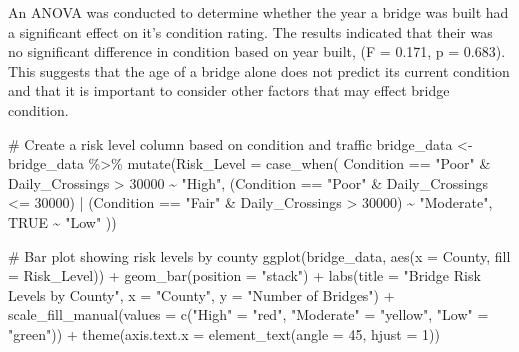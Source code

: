 \documentclass[
  letterpaper,
  DIV=11,
  numbers=noendperiod]{scrreprt}
\newenvironment{Shaded}{\begin{snugshade}}{\end{snugshade}}
\newcommand{\AttributeTok}[1]{\textcolor[rgb]{0.40,0.45,0.13}{#1}}
\newcommand{\CommentTok}[1]{\textcolor[rgb]{0.37,0.37,0.37}{#1}}
\newcommand{\ConstantTok}[1]{\textcolor[rgb]{0.56,0.35,0.01}{#1}}
\newcommand{\DecValTok}[1]{\textcolor[rgb]{0.68,0.00,0.00}{#1}}
\newcommand{\FunctionTok}[1]{\textcolor[rgb]{0.28,0.35,0.67}{#1}}
\newcommand{\NormalTok}[1]{\textcolor[rgb]{0.00,0.23,0.31}{#1}}
\newcommand{\OtherTok}[1]{\textcolor[rgb]{0.00,0.23,0.31}{#1}}
\newcommand{\SpecialCharTok}[1]{\textcolor[rgb]{0.37,0.37,0.37}{#1}}
\newcommand{\StringTok}[1]{\textcolor[rgb]{0.13,0.47,0.30}{#1}}
\begin{document}
An ANOVA was conducted to determine whether the year a bridge was built
had a significant effect on it's condition rating. The results indicated
that their was no significant difference in condition based on year
built, (F = 0.171, p = 0.683). This suggests that the age of a bridge
alone does not predict its current condition and that it is important to
consider other factors that may effect bridge condition.

\begin{Shaded}
\begin{Highlighting}[]
\CommentTok{\# Create a risk level column based on condition and traffic}
\NormalTok{bridge\_data }\OtherTok{\textless{}{-}}\NormalTok{ bridge\_data }\SpecialCharTok{\%\textgreater{}\%}
  \FunctionTok{mutate}\NormalTok{(}\AttributeTok{Risk\_Level =} \FunctionTok{case\_when}\NormalTok{(}
\NormalTok{    Condition }\SpecialCharTok{==} \StringTok{"Poor"} \SpecialCharTok{\&}\NormalTok{ Daily\_Crossings }\SpecialCharTok{\textgreater{}} \DecValTok{30000} \SpecialCharTok{\textasciitilde{}} \StringTok{"High"}\NormalTok{,}
\NormalTok{    (Condition }\SpecialCharTok{==} \StringTok{"Poor"} \SpecialCharTok{\&}\NormalTok{ Daily\_Crossings }\SpecialCharTok{\textless{}=} \DecValTok{30000}\NormalTok{) }\SpecialCharTok{|}
\NormalTok{      (Condition }\SpecialCharTok{==} \StringTok{"Fair"} \SpecialCharTok{\&}\NormalTok{ Daily\_Crossings }\SpecialCharTok{\textgreater{}} \DecValTok{30000}\NormalTok{) }\SpecialCharTok{\textasciitilde{}} \StringTok{"Moderate"}\NormalTok{,}
    \ConstantTok{TRUE} \SpecialCharTok{\textasciitilde{}} \StringTok{"Low"}
\NormalTok{  ))}

\CommentTok{\# Bar plot showing risk levels by county}
\FunctionTok{ggplot}\NormalTok{(bridge\_data, }\FunctionTok{aes}\NormalTok{(}\AttributeTok{x =}\NormalTok{ County, }\AttributeTok{fill =}\NormalTok{ Risk\_Level)) }\SpecialCharTok{+}
  \FunctionTok{geom\_bar}\NormalTok{(}\AttributeTok{position =} \StringTok{"stack"}\NormalTok{) }\SpecialCharTok{+}
  \FunctionTok{labs}\NormalTok{(}\AttributeTok{title =} \StringTok{"Bridge Risk Levels by County"}\NormalTok{,}
       \AttributeTok{x =} \StringTok{"County"}\NormalTok{,}
       \AttributeTok{y =} \StringTok{"Number of Bridges"}\NormalTok{) }\SpecialCharTok{+}
  \FunctionTok{scale\_fill\_manual}\NormalTok{(}\AttributeTok{values =} \FunctionTok{c}\NormalTok{(}\StringTok{"High"} \OtherTok{=} \StringTok{"red"}\NormalTok{, }\StringTok{"Moderate"} \OtherTok{=} \StringTok{"yellow"}\NormalTok{, }\StringTok{"Low"} \OtherTok{=} \StringTok{"green"}\NormalTok{)) }\SpecialCharTok{+}
  \FunctionTok{theme}\NormalTok{(}\AttributeTok{axis.text.x =} \FunctionTok{element\_text}\NormalTok{(}\AttributeTok{angle =} \DecValTok{45}\NormalTok{, }\AttributeTok{hjust =} \DecValTok{1}\NormalTok{))}
\end{Highlighting}
\end{Shaded}
\end{document}
